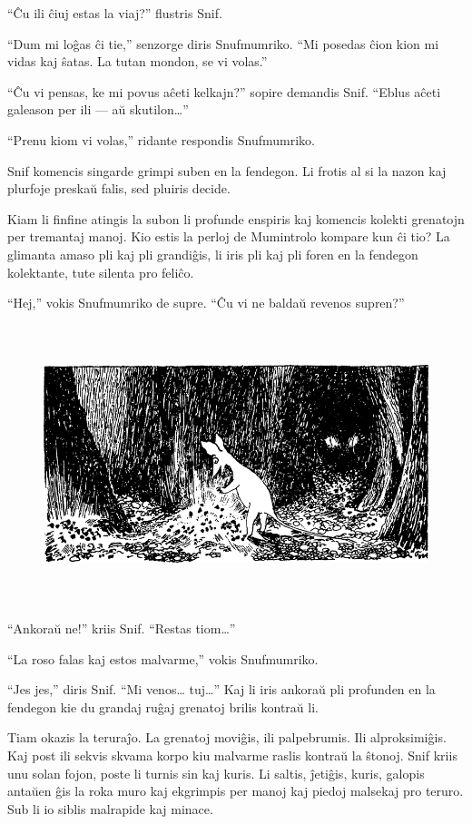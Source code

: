 ``Ĉu ili ĉiuj estas la viaj?'' flustris Snif.

``Dum mi loĝas ĉi tie,'' senzorge diris Snufmumriko. ``Mi posedas ĉion kion mi vidas kaj ŝatas. La tutan mondon, se vi volas.''

``Ĉu vi pensas, ke mi povus aĉeti kelkajn?'' sopire demandis Snif. ``Eblus aĉeti galeason per ili --- aŭ skutilon{\ldots}''

``Prenu kiom vi volas,'' ridante respondis Snufmumriko.

Snif komencis singarde grimpi suben en la fendegon. Li frotis al si la nazon kaj plurfoje preskaŭ falis, sed pluiris decide.

Kiam li finfine atingis la subon li profunde enspiris kaj komencis kolekti grenatojn per tremantaj manoj. Kio estis la perloj de Mumintrolo kompare kun ĉi tio? La glimanta amaso pli kaj pli grandiĝis, li iris pli kaj pli foren en la fendegon kolektante, tute silenta pro feliĉo.

``Hej,'' vokis Snufmumriko de supre. ``Ĉu vi ne baldaŭ revenos supren?''

\begin{figure}[htbp]
\centering
\includegraphics[width=450pt,height=230pt]{3-6.png}
\caption{}
\label{3-6}
\end{figure}

``Ankoraŭ ne!'' kriis Snif. ``Restas tiom{\ldots}''

``La roso falas kaj estos malvarme,'' vokis Snufmumriko.

``Jes jes,'' diris Snif. ``Mi venos{\ldots} tuj{\ldots}'' Kaj li iris ankoraŭ pli profunden en la fendegon kie du grandaj ruĝaj grenatoj brilis kontraŭ li.

Tiam okazis la teruraĵo. La grenatoj moviĝis, ili palpebrumis. Ili alproksimiĝis. Kaj post ili sekvis skvama korpo kiu malvarme raslis kontraŭ la ŝtonoj. Snif kriis unu solan fojon, poste li turnis sin kaj kuris. Li saltis, ĵetiĝis, kuris, galopis antaŭen ĝis la roka muro kaj ekgrimpis per manoj kaj piedoj malsekaj pro teruro. Sub li io siblis malrapide kaj minace.

